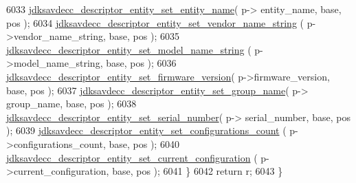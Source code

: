 \begin{DoxyCode}
6033         \hyperlink{group__descriptor__entity_gad94296ee558e018c5854af962b30b4a5}{jdksavdecc\_descriptor\_entity\_set\_entity\_name}( p->
      entity\_name, base, pos );
6034         \hyperlink{group__descriptor__entity_ga33e995f481c1205994c92fd4d6d6f26e}{jdksavdecc\_descriptor\_entity\_set\_vendor\_name\_string}
      ( p->vendor\_name\_string, base, pos );
6035         \hyperlink{group__descriptor__entity_gaa48d9cb8441f774c99716eae31c48104}{jdksavdecc\_descriptor\_entity\_set\_model\_name\_string}
      ( p->model\_name\_string, base, pos );
6036         \hyperlink{group__descriptor__entity_gabcd027285c1ff1ded0880b7dbe2528ec}{jdksavdecc\_descriptor\_entity\_set\_firmware\_version}(
       p->firmware\_version, base, pos );
6037         \hyperlink{group__descriptor__entity_gab440d6d94e09324c658e35852ea54045}{jdksavdecc\_descriptor\_entity\_set\_group\_name}( p->
      group\_name, base, pos );
6038         \hyperlink{group__descriptor__entity_gadafdafafeaf27d1f8a29aebeece5a93b}{jdksavdecc\_descriptor\_entity\_set\_serial\_number}( p->
      serial\_number, base, pos );
6039         \hyperlink{group__descriptor__entity_ga2cb3684cc977fb215fa645508953c83b}{jdksavdecc\_descriptor\_entity\_set\_configurations\_count}
      ( p->configurations\_count, base, pos );
6040         \hyperlink{group__descriptor__entity_gaf340ca89b805316f38254931cd20c1e7}{jdksavdecc\_descriptor\_entity\_set\_current\_configuration}
      ( p->current\_configuration, base, pos );
6041     \}
6042     \textcolor{keywordflow}{return} r;
6043 \}
\end{DoxyCode}



